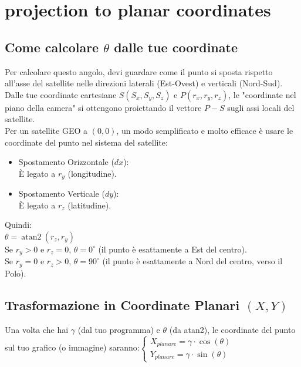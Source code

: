 \documentclass[a4paper,14pt]{article}
\begin{document}
\section{projection to planar coordinates}
\subsection{Come calcolare \(\theta \) dalle tue coordinate}
Per calcolare questo angolo, devi guardare come il punto si sposta rispetto all'asse del satellite nelle direzioni laterali (Est-Ovest) e verticali (Nord-Sud).\\
Dalle tue coordinate cartesiane \(S(S_{x},S_{y},S_{z})\) e \(P(r_{x},r_{y},r_{z})\), le "coordinate nel piano della camera" si ottengono proiettando il vettore \(P-S\) sugli assi locali del satellite.\\
Per un satellite GEO a \((0,0)\), un modo semplificato e molto efficace è usare le coordinate del punto nel sistema del satellite:
\begin{itemize}
\item Spostamento Orizzontale (\(dx\)):\\
È legato a \(r_{y}\) (longitudine).
\item Spostamento Verticale (\(dy\)):\\
È legato a \(r_{z}\) (latitudine).
\end{itemize}
Quindi:\\
\(\theta =\>\mathrm{atan2}\>(r_{z},r_{y})\)\\
Se \(r_{y}>0\) e \(r_{z}=0\), \(\theta =0^{\circ }\) (il punto è esattamente a Est del centro).\\
Se \(r_{y}=0\) e \(r_{z}>0\), \(\theta =90^{\circ }\) (il punto è esattamente a Nord del centro, verso il Polo).\\
\subsection{Trasformazione in Coordinate Planari \((X,Y)\)}
Una volta che hai \(\gamma \) (dal tuo programma) e \(\theta \) (da atan2), le coordinate del punto sul tuo grafico (o immagine) saranno:\(\begin{cases}X_{planare}=\gamma \cdot \cos (\theta )\\ Y_{planare}=\gamma \cdot \sin (\theta )\end{cases}\)\\
\end{document}
